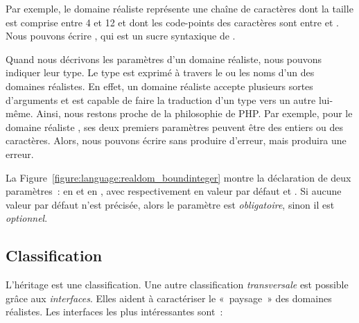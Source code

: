 \begin{example}

Par exemple, le domaine réaliste 
représente une chaîne de caractères dont la taille est comprise entre 4 et 12 et
dont les code-points des caractères sont entre  et . Nous
pouvons écrire , qui est un sucre syntaxique de
.

\end{example}

Quand nous décrivons les paramètres d'un domaine réaliste, nous pouvons indiquer
leur type. Le type est exprimé à travers le ou les noms d'un des domaines
réalistes. En effet, un domaine réaliste accepte plusieurs sortes d'arguments et
est capable de faire la traduction d'un type vers un autre lui-même. Ainsi, nous
restons proche de la philosophie de PHP. Par exemple, pour le domaine réaliste
, ses deux premiers paramètres peuvent être des entiers ou des
caractères. Alors, nous pouvons écrire  sans
produire d'erreur, mais  produira une erreur.

La Figure~\ref{figure:language:realdom_boundinteger} montre la déclaration de
deux paramètres~:  en  et  en ,
avec respectivement en valeur par défaut  et
. Si aucune valeur par défaut n'est précisée, alors le
paramètre est {\em obligatoire}, sinon il est {\em optionnel}.

\subsection{Classification}
\label{subsection:language:realdom:classification}

L'héritage est une classification. Une autre classification {\em transversale}
est possible grâce aux {\em interfaces}. Elles aident à caractériser le
«~paysage~» des domaines réalistes. Les interfaces les plus intéressantes sont~:

